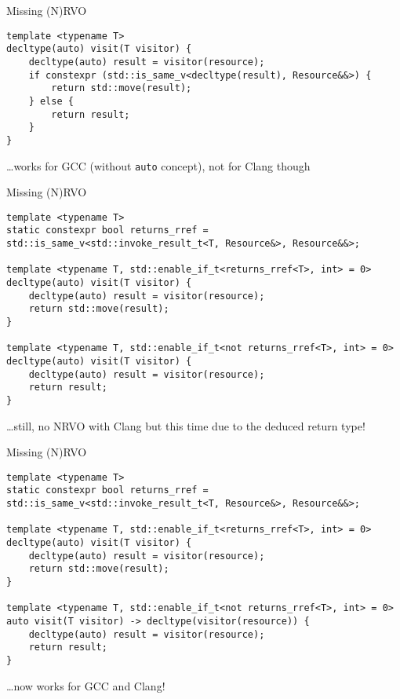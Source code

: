 \begin{frame}[fragile]{Missing (N)RVO}
    \begin{lstlisting}
template <typename T>
decltype(auto) visit(T visitor) {
    decltype(auto) result = visitor(resource);
    if constexpr (std::is_same_v<decltype(result), Resource&&>) {
        return std::move(result);
    } else {
        return result;
    }
}
    \end{lstlisting}

    \hfill \ldots works for GCC (without \texttt{auto} concept), not for Clang though
\end{frame}

\begin{frame}[fragile]{Missing (N)RVO}
    \begin{lstlisting}
template <typename T>
static constexpr bool returns_rref = std::is_same_v<std::invoke_result_t<T, Resource&>, Resource&&>;

template <typename T, std::enable_if_t<returns_rref<T>, int> = 0>
decltype(auto) visit(T visitor) {
    decltype(auto) result = visitor(resource);
    return std::move(result);
}

template <typename T, std::enable_if_t<not returns_rref<T>, int> = 0>
decltype(auto) visit(T visitor) {
    decltype(auto) result = visitor(resource);
    return result;
}
    \end{lstlisting}

    \hfill \ldots still, no NRVO with Clang but this time due to the deduced return type!
\end{frame}

\begin{frame}[fragile]{Missing (N)RVO}
    \begin{lstlisting}
template <typename T>
static constexpr bool returns_rref = std::is_same_v<std::invoke_result_t<T, Resource&>, Resource&&>;

template <typename T, std::enable_if_t<returns_rref<T>, int> = 0>
decltype(auto) visit(T visitor) {
    decltype(auto) result = visitor(resource);
    return std::move(result);
}

template <typename T, std::enable_if_t<not returns_rref<T>, int> = 0>
auto visit(T visitor) -> decltype(visitor(resource)) {
    decltype(auto) result = visitor(resource);
    return result;
}
    \end{lstlisting}

    \hfill \ldots now works for GCC and Clang!
\end{frame}

